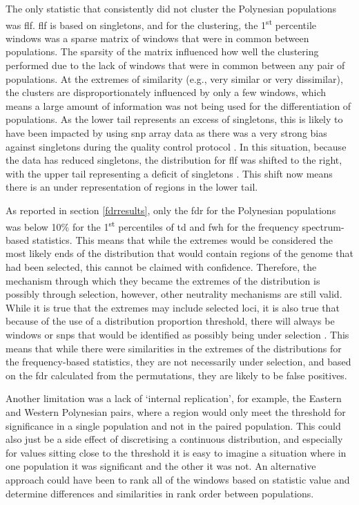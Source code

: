 \documentclass[]{report}
\begin{document}
The only statistic that consistently did not cluster the Polynesian
populations was \gls{flf}. \Gls{flf} is based on singletons, and for the
clustering, the 1\textsuperscript{st} percentile windows was a sparse
matrix of windows that were in common between populations. The sparsity
of the matrix influenced how well the clustering performed due to the
lack of windows that were in common between any pair of populations. At
the extremes of similarity (e.g., very similar or very dissimilar), the
clusters are disproportionately influenced by only a few windows, which
means a large amount of information was not being used for the
differentiation of populations. As the lower tail represents an excess
of singletons, this is likely to have been impacted by using \gls{snp}
array data as there was a very strong bias against singletons during the
quality control protocol \citep{Guo2014}. In this situation, because the
data has reduced singletons, the distribution for \gls{flf} was shifted
to the right, with the upper tail representing a deficit of singletons
\citep{Fu1993}. This shift now means there is an under representation of
regions in the lower tail.

As reported in section \ref{fdrresults}, only the \gls{fdr} for the
Polynesian populations was below 10\% for the 1\textsuperscript{st}
percentiles of \gls{td} and \gls{fwh} for the frequency spectrum-based
statistics. This means that while the extremes would be considered the
most likely ends of the distribution that would contain regions of the
genome that had been selected, this cannot be claimed with confidence.
Therefore, the mechanism through which they became the extremes of the
distribution is possibly through selection, however, other neutrality
mechanisms are still valid. While it is true that the extremes may
include selected loci, it is also true that because of the use of a
distribution proportion threshold, there will always be windows or
\glspl{snp} that would be identified as possibly being under selection
\citep{Teshima2006}. This means that while there were similarities in
the extremes of the distributions for the frequency-based statistics,
they are not necessarily under selection, and based on the \gls{fdr}
calculated from the permutations, they are likely to be false positives.

Another limitation was a lack of `internal replication', for example,
the Eastern and Western Polynesian pairs, where a region would only meet
the threshold for significance in a single population and not in the
paired population. This could also just be a side effect of discretising
a continuous distribution, and especially for values sitting close to
the threshold it is easy to imagine a situation where in one population
it was significant and the other it was not. An alternative approach
could have been to rank all of the windows based on statistic value and
determine differences and similarities in rank order between
populations.
\end{document}
